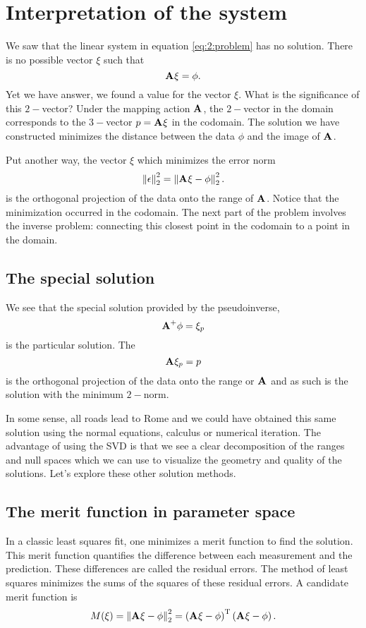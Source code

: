 \section{Interpretation of the system}
We saw that the linear system in equation \eqref{eq:2:problem} has no solution. There is no possible vector $\xi$ such that
\begin{equation}
  \textbf{A}^{\mathrm{}}\xi=\phi.
\end{equation}
Yet we have answer, we found a value for the vector $\xi$. What is the significance of this $2-$vector? Under the mapping action $\textbf{A}^{\mathrm{}}$, the $2-$vector in the domain corresponds to the $3-$vector $p=\textbf{A}^{\mathrm{}}\xi$ in the codomain. The solution we have constructed minimizes the distance between the data $\phi$ and the image of $\textbf{A}^{\mathrm{}}$. 

Put another way, the vector $\xi$ which minimizes the error norm
\begin{equation}
  \left\lVert\epsilon\right\rVert_{2}^{2} = \left\lVert\textbf{A}^{\mathrm{}}\xi-\phi\right\rVert_{2}^{2}.
\end{equation}
is the orthogonal projection of the data onto the range of $\textbf{A}^{\mathrm{}}$. Notice that the minimization occurred in the codomain. The next part of the problem involves the inverse problem: connecting this closest point in the codomain to a point in the domain.

\subsection{The special solution}
We see that the special solution provided by the pseudoinverse,
\begin{equation}
  \textbf{A}^{\mathrm{+}}\phi = \xi_{p}
\end{equation}
is the particular solution. The \vvv 
\begin{equation*}
  \textbf{A}^{\mathrm{}}\xi_{p} = p
\end{equation*}
is the orthogonal projection of the data onto the range or $\textbf{A}^{\mathrm{}}$ and as such is the solution with the minimum $2-$norm.

In some sense, all roads lead to Rome and we could have obtained this same solution using the normal equations, calculus or numerical iteration. The advantage of using the SVD is that we see a clear decomposition of the ranges and null spaces which we can use to visualize the geometry and quality of the solutions. Let's explore these other solution methods.

\subsection{The merit function in parameter space}
In a classic least squares fit, one minimizes a merit function to find the solution. This merit function quantifies the difference between each measurement and the prediction. These differences are called the residual errors. The method of least squares minimizes the sums of the squares of these residual errors. A candidate merit function is
\begin{equation}
  M(\xi) = \left\lVert\textbf{A}^{\mathrm{}}\xi-\phi\right\rVert_{2}^{2} = \left( \textbf{A}^{\mathrm{}}\xi-\phi \right)^{\mathrm{T}}\left( \textbf{A}^{\mathrm{}}\xi-\phi \right).
  \label{eq:merit}
\end{equation}


